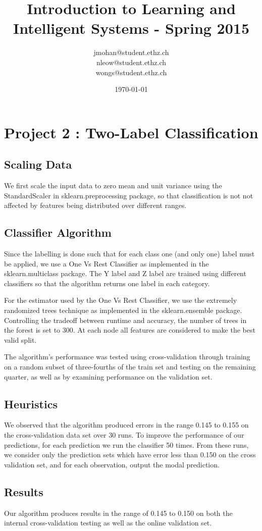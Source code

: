 \documentclass[a4paper, 11pt]{article}
\title{Introduction to Learning and Intelligent Systems - Spring 2015}
\author{jmohan@student.ethz.ch\\ nleow@student.ethz.ch\\ wongs@student.ethz.ch\\}
\date{\today}
\begin{document}
\maketitle

\section*{Project 2 : Two-Label Classification}

\subsection*{Scaling Data}

We first scale the input data to zero mean and unit variance using the StandardScaler in sklearn.preprocessing package, so that classification is not not affected by features being distributed over different ranges.

\subsection*{Classifier Algorithm}

Since the labelling is done such that for each class one (and only one) label must be applied, we use a One Vs Rest Classifier as implemented in the sklearn.multiclass package. The Y label and Z label are trained using different classifiers so that the algorithm returns one label in each category.

For the estimator used by the One Vs Rest Classifier, we use the extremely randomized trees technique as implemented in the sklearn.ensemble package. Controlling the tradeoff between runtime and accuracy, the number of trees in the forest is set to 300. At each node all features are considered to make the best valid split.

The algorithm's performance was tested using cross-validation through training on a random subset of three-fourths of the train set and testing on the remaining quarter, as well as by examining performance on the validation set.

\subsection*{Heuristics}

We observed that the algorithm produced errors in the range 0.145 to 0.155 on the cross-validation data set over 30 runs. To improve the performance of our predictions, for each prediction we run the classifier 50 times. From these runs, we consider only the prediction sets which have error less than 0.150 on the cross validation set, and for each observation, output the modal prediction.
 
\subsection*{Results}

Our algorithm produces results in the range of 0.145 to 0.150 on both the internal cross-validation testing as well as the online validation set.
\end{document}
